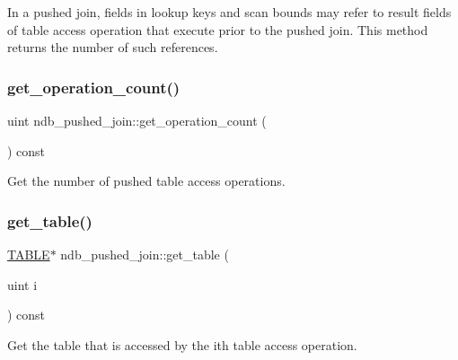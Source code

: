 In a pushed join, fields in lookup keys and scan bounds may refer to result fields of table access operation that execute prior to the pushed join. This method returns the number of such references. \mbox{\label{classndb__pushed__join_a96ff16fa8e23fd510f5f9a4fc52f3327}} 
\subsubsection{\texorpdfstring{get\+\_\+operation\+\_\+count()}{get\_operation\_count()}}
{\footnotesize\ttfamily uint ndb\+\_\+pushed\+\_\+join\+::get\+\_\+operation\+\_\+count (\begin{DoxyParamCaption}{ }\end{DoxyParamCaption}) const\hspace{0.3cm}{\ttfamily [inline]}}

Get the number of pushed table access operations. \mbox{\label{classndb__pushed__join_a4963eabe39daf55f3a48612ad838f40e}} 
\subsubsection{\texorpdfstring{get\+\_\+table()}{get\_table()}}
{\footnotesize\ttfamily \mbox{\hyperlink{structTABLE}{T\+A\+B\+LE}}$\ast$ ndb\+\_\+pushed\+\_\+join\+::get\+\_\+table (\begin{DoxyParamCaption}\item[{uint}]{i }\end{DoxyParamCaption}) const\hspace{0.3cm}{\ttfamily [inline]}}

Get the table that is accessed by the i\textquotesingle{}th table access operation. \mbox{\label{classndb__pushed__join_ac304528e069d75bf6283d9630a346d4e}} 
